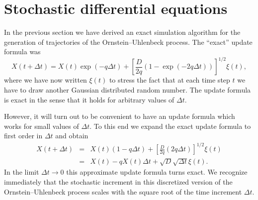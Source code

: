 
\chapter{Stochastic differential equations}

In the previous section we have derived an exact simulation algorithm
for the generation of trajectories of the Ornstein--Uhlenbeck process.
The ``exact'' update formula was
\begin{equation*}
X(t+\Delta t) = X(t) \exp(-q \Delta t) +
  \left[ \frac{D}{2q}(1-\exp(-2q\Delta t)) \right]^{1/2} \xi(t),
\end{equation*}
where we have now written $\xi(t)$ to stress the fact that at each
time step $t$ we have to draw another Gaussian distributed random 
number. The update formula is exact in the sense that it holds for
arbitrary values of $\Delta t$.

However, it will turn out to be convenient to have an update formula
which works for small values of $\Delta t$. To this end we expand the
exact update formula to first order in $\Delta t$ and obtain
\begin{eqnarray}
X(t+\Delta t)& =& X(t) (1- q \Delta t) + 
   \left[ \frac{D}{2q} (2q \Delta t) \right]^{1/2} \xi(t) \nonumber
   \\
\label{SDE_APPROX} 
  & = & X(t) - qX(t) \Delta t + \sqrt{D} \sqrt{\Delta t} \xi(t).
\end{eqnarray}
In the limit $\Delta t \rightarrow 0$ this approximate update formula
turns exact.  We recognize immediately that the stochastic increment in
this discretized version of the Ornstein--Uhlenbeck process scales
with the square root of the time increment $\Delta t$.

